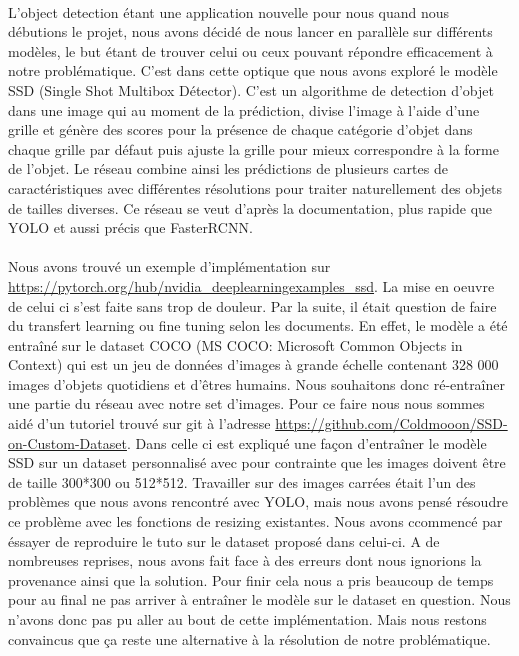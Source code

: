 \paragraph{} L'object detection étant une application nouvelle pour nous quand nous débutions le projet, nous avons décidé de nous lancer en parallèle sur différents modèles, le but étant de trouver celui ou ceux pouvant répondre efficacement à notre problématique. C'est dans cette optique que nous avons exploré le modèle SSD (Single Shot Multibox Détector). C'est un algorithme de detection d'objet dans une image qui au moment de la prédiction, divise l’image à l’aide d’une grille et génère des scores pour la présence de chaque catégorie d'objet dans chaque grille par défaut puis ajuste la grille pour mieux correspondre à la forme de l'objet. Le réseau combine ainsi les prédictions de plusieurs cartes de caractéristiques avec différentes résolutions pour traiter naturellement des objets de tailles diverses. Ce réseau se veut d'après la documentation, plus rapide que YOLO et aussi précis que FasterRCNN. 
\paragraph{} Nous avons trouvé un exemple d'implémentation sur \url{https://pytorch.org/hub/nvidia_deeplearningexamples_ssd}. La mise en oeuvre de celui ci s'est faite sans trop de douleur. Par la suite, il était question de faire du transfert learning ou fine tuning selon les documents. En effet, le modèle a été entraîné sur le dataset COCO (MS COCO: Microsoft Common Objects in Context) qui est un jeu de données d'images à grande échelle contenant 328 000 images d'objets quotidiens et d'êtres humains. Nous souhaitons donc ré-entraîner une partie du réseau avec notre set d'images. Pour ce faire nous nous sommes aidé d'un tutoriel trouvé sur git à l'adresse \url{https://github.com/Coldmooon/SSD-on-Custom-Dataset}. Dans celle ci est expliqué une façon d'entraîner le modèle SSD sur un dataset personnalisé avec pour contrainte que les images doivent être de taille 300*300 ou 512*512. Travailler sur des images carrées était l'un des problèmes que nous avons rencontré avec YOLO, mais nous avons pensé résoudre ce problème avec les fonctions de resizing existantes. 
Nous avons ccommencé par éssayer de reproduire le tuto sur le dataset proposé dans celui-ci. A de nombreuses reprises, nous avons fait face à des erreurs dont nous ignorions la provenance ainsi que la solution. Pour finir cela nous a pris beaucoup de temps pour au final ne pas arriver à entraîner le modèle sur le dataset en question. Nous n'avons donc pas pu aller au bout de cette implémentation. Mais nous restons convaincus que ça reste une alternative à la résolution de notre problématique.

